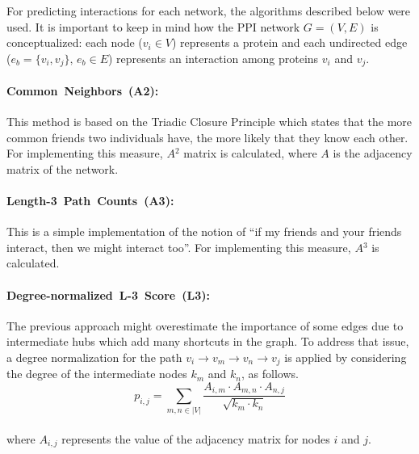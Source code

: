 For predicting interactions for each network, the algorithms described
below were used. It is important to keep in mind how the PPI network
$G=(V,E)$ is conceptualized: each node ($v_{i}\in V$) represents
a protein and each undirected edge ($e_{b}=\{v_{i},v_{j}\},\,e_{b}\in E$)
represents an interaction among proteins $v_{i}$ and $v_{j}$.
\paragraph*{Common~Neighbors~(A2):} This method is based on the Triadic Closure
Principle which states that the more common friends two individuals
have, the more likely that they know each other. For implementing
this measure, $A{{}^2}$ matrix is calculated, where $A$ is the adjacency
matrix of the network.
\paragraph*{Length-3~Path~Counts~(A3):} This is a simple implementation
of the notion of ``if my friends and your friends interact, then
we might interact too''. For implementing this measure, $A{{}^3}$
is calculated.
\paragraph*{Degree-normalized~L-3~Score~(L3):} The previous approach might
overestimate the importance of some edges due to intermediate hubs
which add many shortcuts in the graph. To address that issue, a degree
normalization for the path $v_{i}\rightarrow v_{m}\rightarrow v_{n}\rightarrow v_{j}$
is applied by considering the degree of the intermediate nodes $k_{m}$
and $k_{n}$, as follows.
\[
p_{i,j}=\sum_{m,n\in|V|}\frac{A_{i,m}\cdot A_{m,n}\cdot A_{n,j}}{\sqrt{k_{m}\cdot k_{n}}}
\]
\\
where $A_{i,j}$ represents the value of the adjacency matrix for
nodes $i$ and $j$.

